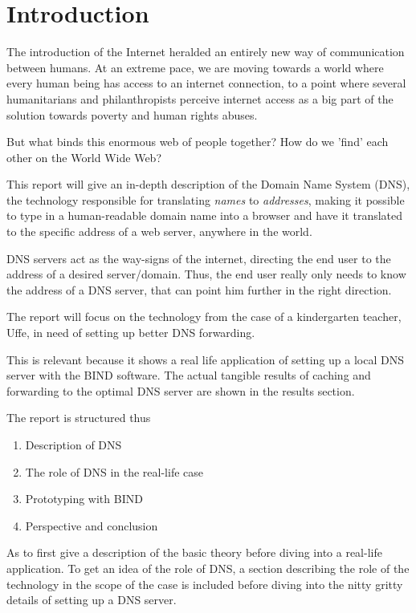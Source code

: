 \chapter{Introduction}
The introduction of the Internet heralded an entirely new way of communication between humans. At an extreme pace, we are moving towards a world where every human being has access to an internet connection, to a point where several humanitarians and philanthropists perceive internet access as a big part of the solution towards poverty and human rights abuses.

But what binds this enormous web of people together? How do we 'find' each other on the World Wide Web?

This report will give an in-depth description of the Domain Name System (DNS), the technology responsible for translating \textit{names} to \textit{addresses}, making it possible to type in a human-readable domain name into a browser and have it translated to the specific address of a web server, anywhere in the world.

DNS servers act as the way-signs of the internet, directing the end user to the address of a desired server/domain. Thus, the end user really only needs to know the address of a DNS server, that can point him further in the right direction.

The report will focus on the technology from the case of a kindergarten teacher, Uffe, in need of setting up better DNS forwarding. 

This is relevant because it shows a real life application of setting up a local DNS server with the BIND software. The actual tangible results of caching and forwarding to the optimal DNS server are shown in the results section.

The report is structured thus
\begin{enumerate}
\item Description of DNS
\item The role of DNS in the real-life case
\item Prototyping with BIND
\item Perspective and conclusion
\end{enumerate}

As to first give a description of the basic theory before diving into a real-life application. To get an idea of the role of DNS, a section describing the role of the technology in the scope of the case is included before diving into the nitty gritty details of setting up a DNS server.